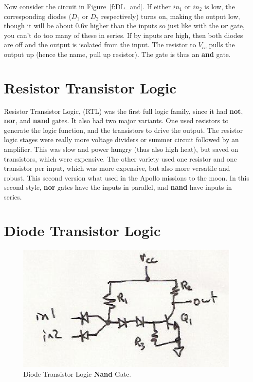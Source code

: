 Now consider the circuit in Figure~\ref{f:DL_and}.  If either $in_1$ or $in_2$ is low, the corresponding diodes ($D_1$ or $D_2$ respectively) turns on, making the output low, though it will be about 0.6v higher than the inputs so just like with the \textbf{or} gate, you can't do too many of these in series.  If by inputs are high, then both diodes are off and the output is isolated from the input.  The resistor to $V_{cc}$ pulls the output up (hence the name, pull up resistor).  The gate is thus an \textbf{and} gate.


\section{Resistor Transistor Logic}
Resistor Transistor Logic, (RTL) was the first full logic family, since it had \textbf{not}, \textbf{nor}, and \textbf{nand }gates.  It also had two major variants.  One used resistors to generate the logic function, and the transistors to drive the output.  The resistor logic stages were really more voltage dividers or summer circuit followed by an amplifier.  This was slow and power hungry (thus also high heat), but saved on transistors, which were expensive.  The other variety used one resistor and one transistor per input, which was more expensive, but also more versatile and robust.  This second version what used in the Apollo missions to the moon.  In this second style, \textbf{nor} gates have the inputs in parallel, and \textbf{nand} have inputs in series.


\section{Diode Transistor Logic}


\begin{figure}
\begin{center}
\caption{Diode Transistor Logic \textbf{Nand} Gate.}\label{f:DTL_nand}
\includegraphics{images/DTLnand.eps}
\end{center}
\end{figure}

